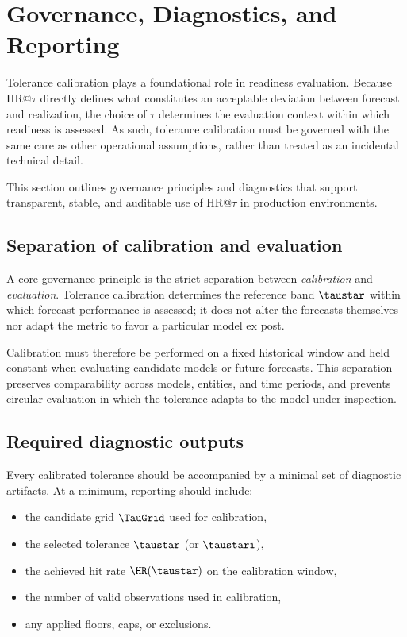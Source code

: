 \section{Governance, Diagnostics, and Reporting}
\label{sec:governance}

Tolerance calibration plays a foundational role in readiness evaluation.
Because HR@$\tau$ directly defines what constitutes an acceptable deviation
between forecast and realization, the choice of $\tau$ determines the evaluation
context within which readiness is assessed.
As such, tolerance calibration must be governed with the same care as other
operational assumptions, rather than treated as an incidental technical detail.

This section outlines governance principles and diagnostics that support
transparent, stable, and auditable use of HR@$\tau$ in production environments.

\subsection{Separation of calibration and evaluation}
\label{subsec:separation}

A core governance principle is the strict separation between
\emph{calibration} and \emph{evaluation}.
Tolerance calibration determines the reference band $\taustar$ within which
forecast performance is assessed; it does not alter the forecasts themselves
nor adapt the metric to favor a particular model ex post.

Calibration must therefore be performed on a fixed historical window and held
constant when evaluating candidate models or future forecasts.
This separation preserves comparability across models, entities, and time
periods, and prevents circular evaluation in which the tolerance adapts to the
model under inspection.

\subsection{Required diagnostic outputs}
\label{subsec:diagnostics}

Every calibrated tolerance should be accompanied by a minimal set of diagnostic
artifacts.
At a minimum, reporting should include:
\begin{itemize}[leftmargin=*]
    \item the candidate grid $\TauGrid$ used for calibration,
    \item the selected tolerance $\taustar$ (or $\taustari$),
    \item the achieved hit rate $\HR(\taustar)$ on the calibration window,
    \item the number of valid observations used in calibration,
    \item any applied floors, caps, or exclusions.
\end{itemize}

